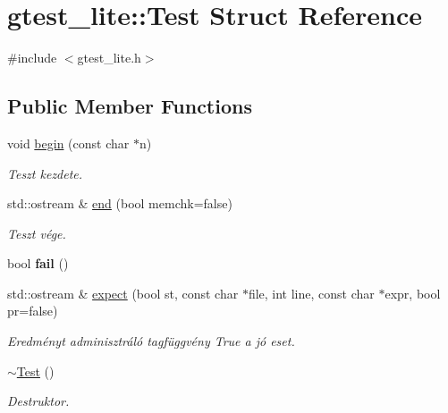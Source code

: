 \hypertarget{structgtest__lite_1_1_test}{}\section{gtest\+\_\+lite\+::Test Struct Reference}
\label{structgtest__lite_1_1_test}


{\ttfamily \#include $<$gtest\+\_\+lite.\+h$>$}

\subsection*{Public Member Functions}
\begin{DoxyCompactItemize}
\item 
\mbox{\label{structgtest__lite_1_1_test_a2227b70fcc5dfb3c326bf117dd8f7e79}} 
void \mbox{\hyperlink{structgtest__lite_1_1_test_a2227b70fcc5dfb3c326bf117dd8f7e79}{begin}} (const char $\ast$n)
\begin{DoxyCompactList}\small\item\em Teszt kezdete. \end{DoxyCompactList}\item 
\mbox{\label{structgtest__lite_1_1_test_a658c1eee35f170294c354ebf4d3fc1ba}} 
std\+::ostream \& \mbox{\hyperlink{structgtest__lite_1_1_test_a658c1eee35f170294c354ebf4d3fc1ba}{end}} (bool memchk=false)
\begin{DoxyCompactList}\small\item\em Teszt vége. \end{DoxyCompactList}\item 
\mbox{\label{structgtest__lite_1_1_test_aadbfd0f53c56d975f793602996631195}} 
bool {\bfseries fail} ()
\item 
\mbox{\label{structgtest__lite_1_1_test_a0bca03315e5963f7fdfffd92d2daed6a}} 
std\+::ostream \& \mbox{\hyperlink{structgtest__lite_1_1_test_a0bca03315e5963f7fdfffd92d2daed6a}{expect}} (bool st, const char $\ast$file, int line, const char $\ast$expr, bool pr=false)
\begin{DoxyCompactList}\small\item\em Eredményt adminisztráló tagfüggvény True a jó eset. \end{DoxyCompactList}\item 
\mbox{\label{structgtest__lite_1_1_test_a5a879233c2aa110626668c06140f6e71}} 
\mbox{\hyperlink{structgtest__lite_1_1_test_a5a879233c2aa110626668c06140f6e71}{$\sim$\+Test}} ()
\begin{DoxyCompactList}\small\item\em Destruktor. \end{DoxyCompactList}\end{DoxyCompactItemize}
